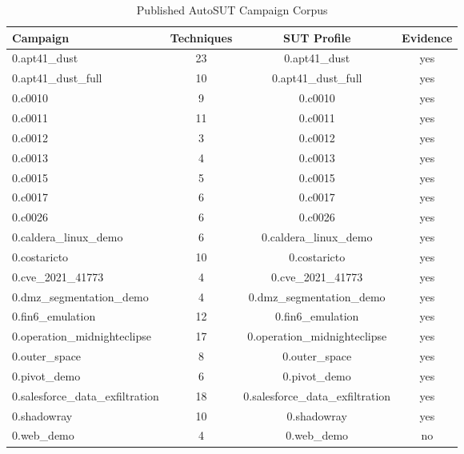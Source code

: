 \begin{table}[htbp]
\centering
\caption{Published AutoSUT Campaign Corpus}
\label{tab:corpus}
\begin{tabular}{lccc}
\toprule
Campaign & Techniques & SUT Profile & Evidence \\
\midrule
0.apt41_dust & 23 & 0.apt41_dust & yes \\
0.apt41_dust_full & 10 & 0.apt41_dust_full & yes \\
0.c0010 & 9 & 0.c0010 & yes \\
0.c0011 & 11 & 0.c0011 & yes \\
0.c0012 & 3 & 0.c0012 & yes \\
0.c0013 & 4 & 0.c0013 & yes \\
0.c0015 & 5 & 0.c0015 & yes \\
0.c0017 & 6 & 0.c0017 & yes \\
0.c0026 & 6 & 0.c0026 & yes \\
0.caldera_linux_demo & 6 & 0.caldera_linux_demo & yes \\
0.costaricto & 10 & 0.costaricto & yes \\
0.cve_2021_41773 & 4 & 0.cve_2021_41773 & yes \\
0.dmz_segmentation_demo & 4 & 0.dmz_segmentation_demo & yes \\
0.fin6_emulation & 12 & 0.fin6_emulation & yes \\
0.operation_midnighteclipse & 17 & 0.operation_midnighteclipse & yes \\
0.outer_space & 8 & 0.outer_space & yes \\
0.pivot_demo & 6 & 0.pivot_demo & yes \\
0.salesforce_data_exfiltration & 18 & 0.salesforce_data_exfiltration & yes \\
0.shadowray & 10 & 0.shadowray & yes \\
0.web_demo & 4 & 0.web_demo & no \\
\bottomrule
\end{tabular}
\end{table}
